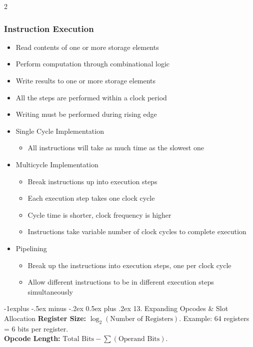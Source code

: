 \documentclass[10pt, portrait]{article}
\makeatletter
\renewcommand{\section}{\@startsection{section}{1}{0mm}%
                                {-1ex plus -.5ex minus -.2ex}%
                                {0.5ex plus .2ex}%
                                {\normalfont\large\bfseries}}
\renewcommand{\section}{\@startsection{section}{2}{0mm}%
                                {-1explus -.5ex minus -.2ex}%
                                {0.5ex plus .2ex}%
                                {\normalfont\normalsize\bfseries}}
\makeatother
\begin{document}
\begin{multicols*}{2}
\subsubsection{Instruction Execution}
\begin{itemize}
    \item Read contents of one or more storage elements
    \item Perform computation through combinational logic
    \item Write results to one or more storage elements
    \item All the steps are performed within a clock period
    \item Writing must be performed during rising edge
    \item Single Cycle Implementation
    \begin{itemize}
        \item All instructions will take as much time as the slowest one
    \end{itemize}
    \item Multicycle Implementation
    \begin{itemize}
        \item Break instructions up into execution steps
        \item Each execution step takes one clock cycle
        \item Cycle time is shorter, clock frequency is higher
        \item Instructions take variable number of clock cycles to complete execution
    \end{itemize}
    \item Pipelining
    \begin{itemize}
        \item Break up the instructions into execution steps, one per clock cycle
        \item Allow different instructions to be in different execution steps simultaneously
    \end{itemize}
\end{itemize}

\section{13. Expanding Opcodes \& Slot Allocation}
\textbf{Register Size:} $\log_2(\text{Number of Registers})$. Example: 64 registers = 6 bits per register. \\
\textbf{Opcode Length:} $\text{Total Bits} - \sum(\text{Operand Bits})$. 


\end{multicols*}
\end{document}
